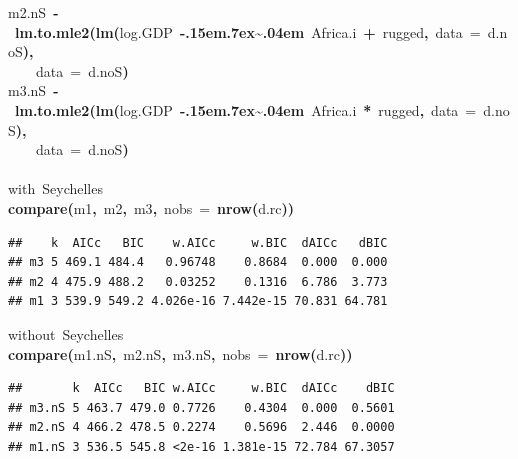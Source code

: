 \documentclass{article}
\makeatletter
\newcommand{\hlfunctioncall}[1]{\textcolor[rgb]{.5,0,.33}{\textbf{#1}}}%
\newcommand{\hlkeyword}[1]{\textbf{#1}}%
\newcommand{\hlargument}[1]{\textcolor[rgb]{.69,.25,.02}{#1}}%
\newcommand{\hlcomment}[1]{\textcolor[rgb]{.18,.6,.34}{#1}}%
\newcommand{\hlassignement}[1]{\textbf{#1}}%
\newcommand{\hlsymbol}[1]{#1}%
\def\urltilda{\kern -.15em\lower .7ex\hbox{\~{}}\kern .04em}%
\newcommand{\hlstd}[1]{\textcolor[rgb]{0,0,0}{#1}}%
\newenvironment{kframe}{%
 \def\FrameCommand##1{\hskip\@totalleftmargin \hskip-\fboxsep
 \colorbox{shadecolor}{##1}\hskip-\fboxsep
     \hskip-\linewidth \hskip-\@totalleftmargin \hskip\columnwidth}%
 \MakeFramed {\advance\hsize-\width
   \@totalleftmargin\z@ \linewidth\hsize
   \@setminipage}}%
 {\par\unskip\endMakeFramed}
\newenvironment{knitrout}{}{} %
\makeatother
\begin{document}
\begin{knitrout}
{\begin{kframe}
\begin{flushleft}
\hlstd{}\hlsymbol{m2.nS}{\ }\hlassignement{\usebox{\hlnormalsizeboxlessthan}-}{\ }\hlfunctioncall{lm.to.mle2}\hlkeyword{(}\hlfunctioncall{lm}\hlkeyword{(}\hlsymbol{log.GDP}{\ }\hlkeyword{\urltilda{}}{\ }\hlsymbol{Africa.i}{\ }\hlkeyword{+}{\ }\hlsymbol{rugged}\hlkeyword{,}{\ }\hlargument{data}{\ }\hlargument{=}{\ }\hlsymbol{d.noS}\hlkeyword{)}\hlkeyword{,}\hspace*{\fill}\\
\hlstd{}{\ }{\ }{\ }{\ }\hlargument{data}{\ }\hlargument{=}{\ }\hlsymbol{d.noS}\hlkeyword{)}\hspace*{\fill}\\
\hlstd{}\hlsymbol{m3.nS}{\ }\hlassignement{\usebox{\hlnormalsizeboxlessthan}-}{\ }\hlfunctioncall{lm.to.mle2}\hlkeyword{(}\hlfunctioncall{lm}\hlkeyword{(}\hlsymbol{log.GDP}{\ }\hlkeyword{\urltilda{}}{\ }\hlsymbol{Africa.i}{\ }\hlkeyword{*}{\ }\hlsymbol{rugged}\hlkeyword{,}{\ }\hlargument{data}{\ }\hlargument{=}{\ }\hlsymbol{d.noS}\hlkeyword{)}\hlkeyword{,}\hspace*{\fill}\\
\hlstd{}{\ }{\ }{\ }{\ }\hlargument{data}{\ }\hlargument{=}{\ }\hlsymbol{d.noS}\hlkeyword{)}\hspace*{\fill}\\
\hlstd{}\hspace*{\fill}\\
\hlstd{}\hlcomment{\usebox{\hlnormalsizeboxhash}with{\ }Seychelles}\hspace*{\fill}\\
\hlstd{}\hlfunctioncall{compare}\hlkeyword{(}\hlsymbol{m1}\hlkeyword{,}{\ }\hlsymbol{m2}\hlkeyword{,}{\ }\hlsymbol{m3}\hlkeyword{,}{\ }\hlargument{nobs}{\ }\hlargument{=}{\ }\hlfunctioncall{nrow}\hlkeyword{(}\hlsymbol{d.rc}\hlkeyword{)}\hlkeyword{)}\mbox{}
\normalfont
\end{flushleft}
\begin{verbatim}
##    k  AICc   BIC    w.AICc     w.BIC  dAICc   dBIC
## m3 5 469.1 484.4   0.96748    0.8684  0.000  0.000
## m2 4 475.9 488.2   0.03252    0.1316  6.786  3.773
## m1 3 539.9 549.2 4.026e-16 7.442e-15 70.831 64.781
\end{verbatim}
\begin{flushleft}
\ttfamily\noindent
\hlcomment{\usebox{\hlnormalsizeboxhash}without{\ }Seychelles}\hspace*{\fill}\\
\hlstd{}\hlfunctioncall{compare}\hlkeyword{(}\hlsymbol{m1.nS}\hlkeyword{,}{\ }\hlsymbol{m2.nS}\hlkeyword{,}{\ }\hlsymbol{m3.nS}\hlkeyword{,}{\ }\hlargument{nobs}{\ }\hlargument{=}{\ }\hlfunctioncall{nrow}\hlkeyword{(}\hlsymbol{d.rc}\hlkeyword{)}\hlkeyword{)}\mbox{}
\normalfont
\end{flushleft}
\begin{verbatim}
##       k  AICc   BIC w.AICc     w.BIC  dAICc    dBIC
## m3.nS 5 463.7 479.0 0.7726    0.4304  0.000  0.5601
## m2.nS 4 466.2 478.5 0.2274    0.5696  2.446  0.0000
## m1.nS 3 536.5 545.8 <2e-16 1.381e-15 72.784 67.3057
\end{verbatim}
\end{kframe}}
\end{knitrout}
\end{document}
